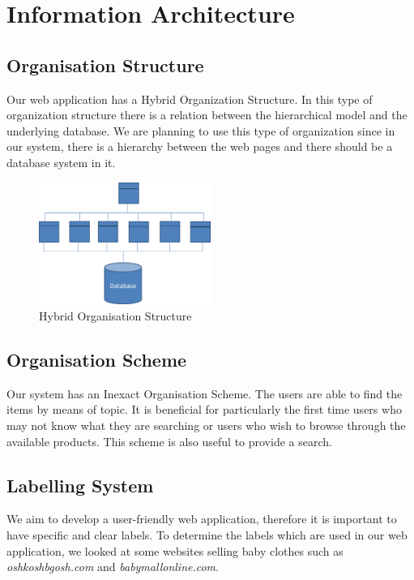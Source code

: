\section{Information Architecture}

\subsection{Organisation Structure}
Our web application has a Hybrid Organization Structure. In this type of organization structure there is a relation between the hierarchical model and the underlying database. We are planning to use this type of organization since in our system, there is a hierarchy between the web pages and there should be a database system in it.

\begin{figure}[ht!]
  \centering  
  \includegraphics[width=0.5\textwidth]{Images/hybrid_org.png}                
  \caption{Hybrid Organisation Structure}
  \label{fig:hybrid_org}
\end{figure}


\subsection{Organisation Scheme}
Our system has an Inexact Organisation Scheme. The users are able to find the items by means of topic. It is beneficial for particularly the first time users who may not know what they are searching or users who wish to browse through the available products. This scheme is also useful to provide a search.

\subsection{Labelling System}
We aim to develop a user-friendly web application, therefore it is important to have specific and clear labels. To determine the labels which are used in our web application, we looked at some websites selling baby clothes such as \textit{oshkoshbgosh.com} and \textit{babymallonline.com}.

